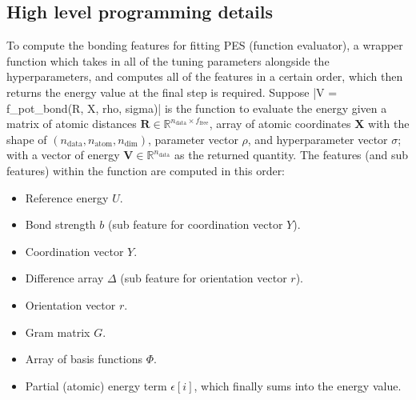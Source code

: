 \documentclass[12pt]{article}
\begin{document}
\subsection{High level programming details}
To compute the bonding features for fitting PES (function evaluator), a wrapper function which takes in all of the tuning parameters alongside the hyperparameters, and computes all of the features in a certain order, which then returns the energy value at the final step is required. Suppose 
|V = f_pot_bond(R, X, rho, sigma)| 
\noindent is the function to evaluate the energy given a matrix of atomic distances $\textbf{R} \in \mathbb{R}^{n_\text{data} \times f_\text{free}}$, array of atomic coordinates $\textbf{X}$ with the shape of $(n_\text{data}, n_\text{atom}, n_\text{dim})$, parameter vector $\rho$, and hyperparameter vector $\sigma$; with a vector of energy $\textbf{V} \in \mathbb{R}^{n_\text{data}}$ as the returned quantity. The features (and sub features) within the function are computed in this order:
\begin{itemize}
    \item Reference energy $U$.
    \item Bond strength $b$ (sub feature for coordination vector $Y$).
    \item Coordination vector $Y$.
    \item Difference array $\Delta$ (sub feature for orientation vector $r$).
    \item Orientation vector $r$.
    \item Gram matrix $G$.
    \item Array of basis functions $\Phi$.
    \item Partial (atomic) energy term $\epsilon[i]$, which finally sums into the energy value.
\end{itemize}
\end{document}
